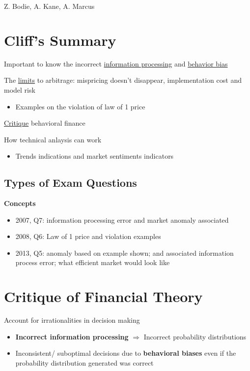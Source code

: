 \documentclass[]{book}
\providecommand{\tightlist}{%
  \setlength{\itemsep}{0pt}\setlength{\parskip}{0pt}}
\theoremstyle{definition}
\theoremstyle{definition}
\theoremstyle{remark}
\begin{document}
Z. Bodie, A. Kane, A. Marcus

\section{Cliff's Summary}\label{cliffs-summary-6}

Important to know the incorrect
\protect\hyperlink{info-process}{information processing} and
\protect\hyperlink{bias}{behavior bias}

The \protect\hyperlink{limits-to-a}{limits} to arbitrage: mispricing
doesn't disappear, implementation cost and model risk

\begin{itemize}
\tightlist
\item
  Examples on the violation of law of 1 price
\end{itemize}

\protect\hyperlink{bad-behav}{Critique} behavioral finance

How technical anlaysis can work

\begin{itemize}
\tightlist
\item
  Trends indications and market sentiments indicators
\end{itemize}

\subsection{Types of Exam Questions}\label{types-of-exam-questions-6}

\textbf{Concepts}

\begin{itemize}
\tightlist
\item
  2007, Q7: information processing error and market anomaly associated
\item
  2008, Q6: Law of 1 price and violation examples
\item
  2013, Q5: anomaly based on example shown; and associated information
  process error; what efficient market would look like
\end{itemize}

\section{Critique of Financial
Theory}\label{critique-of-financial-theory}

Account for irrationalities in decision making

\begin{itemize}
\item
  \textbf{Incorrect information processing} \(\Rightarrow\) Incorrect
  probability distributions
\item
  Inconsistent/ suboptimal decisions due to \textbf{behavioral biases}
  even if the probability distribution generated was correct
\end{itemize}
\end{document}
